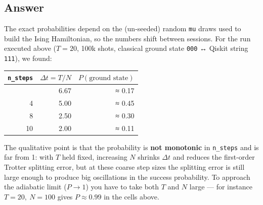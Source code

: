 \documentclass[11pt]{article}
\begin{document}
    \subsection{\texorpdfstring{\textbf{Answer}}{Answer}}\label{answer}

The exact probabilities depend on the (un-seeded) random \texttt{mu}
draws used to build the Ising Hamiltonian, so the numbers shift between
sessions. For the run executed above (\(T=20\), 100k shots, classical
ground state \texttt{000} ↔ Qiskit string \texttt{111}), we found:

\begin{longtable}[]{@{}rrr@{}}
\toprule\noalign{}
\texttt{n\_steps} & \(\Delta t = T/N\) & \(P(\text{ground state})\) \\
\midrule\noalign{}
\endhead
\bottomrule\noalign{}
\endlastfoot
3 & 6.67 & ≈ 0.17 \\
4 & 5.00 & ≈ 0.45 \\
8 & 2.50 & ≈ 0.30 \\
10 & 2.00 & ≈ 0.11 \\
\end{longtable}

The qualitative point is that the probability is \textbf{not monotonic}
in \texttt{n\_steps} and is far from 1: with \(T\) held fixed,
increasing \(N\) shrinks \(\Delta t\) and reduces the first-order
Trotter splitting error, but at these coarse step sizes the splitting
error is still large enough to produce big oscillations in the success
probability. To approach the adiabatic limit (\(P \to 1\)) you have to
take both \(T\) and \(N\) large --- for instance \(T=20,\ N=100\) gives
\(P \approx 0.99\) in the cells above.


    
    
    
\end{document}
